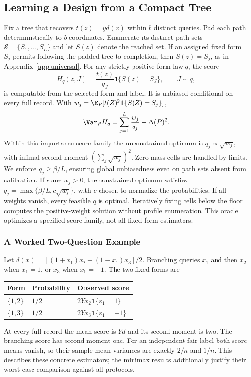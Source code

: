 \subsection{Learning a Design from a Compact Tree}\label{app:pathdesign}
Fix a tree that recovers $t(z)=yd(x)$ within $b$ distinct queries. Pad each path deterministically to $b$ coordinates. Enumerate its distinct path sets $\mathcal S=\{S_1,\ldots,S_L\}$ and let $S(z)$ denote the reached set. If an assigned fixed form $S_j$ permits following the padded tree to completion, then $S(z)=S_j$, as in Appendix~\ref{app:universal}. For any strictly positive form law $q$, the score
\[
 H_q(z,J)=\frac{t(z)}{q_J}\mathbf1\{S(z)=S_J\},\qquad J\sim q,
\]
is computable from the selected form and label. It is unbiased conditional on every full record. With $w_j=\E_P[t(Z)^2\mathbf1\{S(Z)=S_j\}]$,
\begin{equation}
 \Var_P H_q=\sum_{j=1}^L\frac{w_j}{q_j}-\Delta(P)^2.
 \label{eq:pathvariance}
\end{equation}
Within this importance-score family the unconstrained optimum is $q_j\propto\sqrt{w_j}$, with infimal second moment $(\sum_j\sqrt{w_j})^2$. Zero-mass cells are handled by limits. We enforce $q_j\ge\beta/L$, ensuring global unbiasedness even on path sets absent from calibration. If some $w_j>0$, the constrained optimum satisfies $q_j=\max\{\beta/L,c\sqrt{w_j}\}$, with $c$ chosen to normalize the probabilities. If all weights vanish, every feasible $q$ is optimal. Iteratively fixing cells below the floor computes the positive-weight solution without profile enumeration. This oracle optimizes a specified score family, not all fixed-form estimators.

\subsubsection{A Worked Two-Question Example}
Let $d(x)=[(1+x_1)x_2+(1-x_1)x_3]/2$. Branching queries $x_1$ and then $x_2$ when $x_1=1$, or $x_3$ when $x_1=-1$. The two fixed forms are
\begin{center}
\begin{tabular}{lll}
\toprule
Form & Probability & Observed score\\
\midrule
$\{1,2\}$ & $1/2$ & $2Yx_2\mathbf1\{x_1=1\}$\\
$\{1,3\}$ & $1/2$ & $2Yx_3\mathbf1\{x_1=-1\}$\\
\bottomrule
\end{tabular}
\end{center}
At every full record the mean score is $Yd$ and its second moment is two. The branching score has second moment one. For an independent fair label both score means vanish, so their sample-mean variances are exactly $2/n$ and $1/n$. This describes these concrete estimators; the minimax results additionally justify their worst-case comparison against all protocols.

